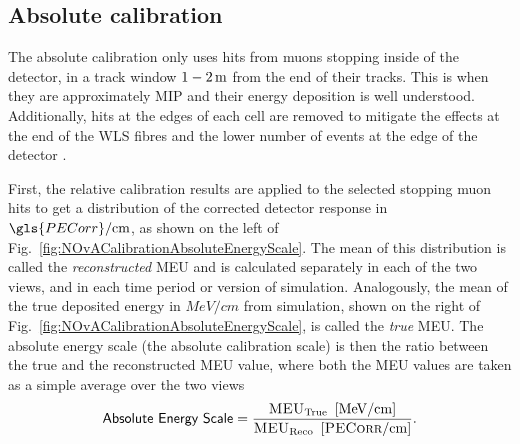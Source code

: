 
\subsection{Absolute calibration}

The absolute calibration only uses hits from muons stopping inside of the detector, in a track window $\unit[1-2]{m}$ from the end of their tracks. This is when they are approximately \gls{MIP} and their energy deposition is well understood. Additionally, hits at the edges of each cell are removed to mitigate the  effects at the end of the \gls{WLS} fibres and the lower number of events at the edge of the detector \cite{NOvA-doc-13579-FACalorimetricEnergyScale}.

First, the relative calibration results are applied to the selected stopping muon hits to get a distribution of the corrected detector response in $\gls{PECorr}/\unit{cm}$, as shown on the left of Fig.~\ref{fig:NOvACalibrationAbsoluteEnergyScale}. The mean of this distribution is called the \textit{reconstructed} \gls{MEU} and is calculated separately in each of the two views, and in each time period or version of simulation. Analogously, the mean of the true deposited energy in $\unit{MeV/cm}$ from simulation, shown on the right of Fig.~\ref{fig:NOvACalibrationAbsoluteEnergyScale}, is called the \textit{true} \gls{MEU}. The absolute energy scale (the absolute calibration scale) is then the ratio between the true and the reconstructed \gls{MEU} value, where both  the \gls{MEU} values are taken as a simple average over the two views
\begin{equation}\label{eq:NOvAAbsEnergyScale}
\textsf{Absolute Energy Scale} = \frac{\textsc{MEU}_{\mathrm{True}}\ \left[\unit{MeV/cm}\right]}{\textsc{MEU}_{\mathrm{Reco}}\ \left[\unit{\textsc{PECorr}/cm}\right]}.
\end{equation}

